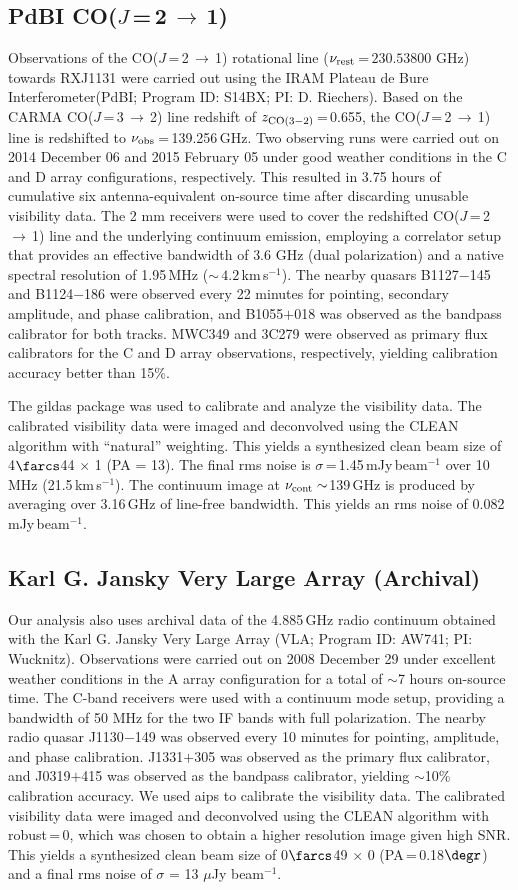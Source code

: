 \documentclass[]{emulateapj}
\newcommand{\rarr}{$\rightarrow$}
\newcommand{\bco}{\mbox{CO($J$\,=\,2\,\rarr\,1)}\xspace}
\newcommand{\cco}{\mbox{CO($J$\,=\,3\,\rarr\,2)}\xspace}
\newcommand{\kms}{\mbox{km\,s$^{-1}$}\xspace}
\newcommand{\pmOne}{\mbox{$^{-1}$}\xspace}
\newcommand{\eq}{\,=\,}
\def\pdbi     {Plateau de Bure Interferometer\xspace}
\newcommand{\ncode}[1]{{\sc #1}}
\begin{document}
\subsection{PdBI \bco}
Observations of the \bco rotational line
($\nu_{\rm rest}$\,=\,$230.53800$ GHz)
towards RXJ1131
were carried out using the IRAM \pdbi (PdBI; Program ID: S14BX; PI: D.
Riechers).
Based on the CARMA \cco line redshift of $z_{\rm CO(3-2)}$\eq0.655,
the \bco line is redshifted to $\nu_{\rm obs}$\eq139.256\,GHz.
Two observing runs were carried out on 2014 December 06 and 2015
February 05 under good weather conditions in the C and D array configurations,
respectively.
This resulted in 3.75 hours of cumulative six antenna-equivalent on-source
time after discarding unusable visibility data.
The 2 mm receivers were used to cover the redshifted \bco line
and the underlying continuum emission, employing a correlator setup that provides
an effective bandwidth of 3.6 GHz (dual polarization) and a native spectral resolution of 1.95\,MHz
($\sim$\,$4.2$\,\kms).
The nearby quasars B1127$-$145 and B1124$-$186 were observed every 22 minutes
for pointing, secondary amplitude, and phase calibration, and B1055$+$018 was
observed as the bandpass calibrator for both tracks.
MWC349 and 3C279 were observed as primary flux calibrators for the C and D
array observations, respectively, yielding calibration accuracy better than 15\%.

The \ncode{gildas} package was used to calibrate and analyze the visibility data.
The calibrated visibility data were imaged and deconvolved using the CLEAN algorithm with ``natural''
weighting. This yields a synthesized clean beam size of 4$\farcs$44 $\times$ 1 (PA = 13\degr).
The final rms noise is $\sigma$\,=\,1.45\,mJy\,beam\pmOne
over 10 MHz (21.5\,\kms). The continuum image at $\nu_{\rm cont}\sim$139\,GHz
is produced by averaging over 3.16\,GHz of line-free bandwidth. This
yields an rms noise of 0.082 mJy\,beam$^{-1}$.

\subsection{Karl G. Jansky Very Large Array (Archival)}
Our analysis also uses archival data of the 4.885\,GHz
radio continuum obtained with the
Karl G. Jansky Very Large Array (VLA; Program ID: AW741; PI: Wucknitz).
Observations were carried out on 2008 December 29 under excellent weather
conditions in the A array configuration for a total of $\sim$7 hours on-source time. The C-band receivers were used with a continuum mode setup,
providing a bandwidth of 50 MHz for the two IF bands with full polarization.
The nearby radio quasar J1130$-$149 was observed every 10 minutes for
pointing, amplitude, and phase calibration. J1331$+$305 was observed as the
primary flux calibrator, and J0319$+$415 was observed as the bandpass
calibrator, yielding $\sim$10\% calibration accuracy.
We used \ncode{aips} to calibrate the visibility data.
The calibrated visibility data were imaged and deconvolved using
the CLEAN algorithm with robust\,=\,0, which
was chosen to obtain a higher resolution image given high SNR.
This yields a synthesized clean
beam size of 0$\farcs$49 $\times$ 0 (PA\,=\,0.18$\degr$) and a final
rms noise of $\sigma$ = 13 $\mu$Jy beam\pmOne.
\end{document}
